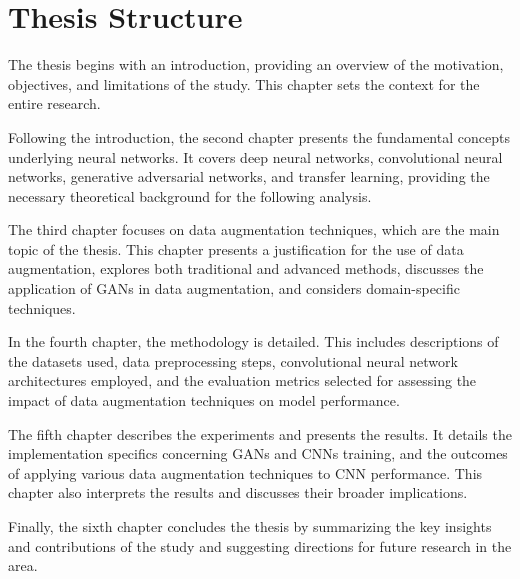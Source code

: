 \section{Thesis Structure}

The thesis begins with an introduction, providing an overview of the motivation, objectives, and limitations of the study. This chapter sets the context for the entire research.

Following the introduction, the second chapter presents the fundamental concepts underlying neural networks. It covers deep neural networks, convolutional neural networks, generative adversarial networks, and transfer learning, providing the necessary theoretical background for the following analysis.

The third chapter focuses on data augmentation techniques, which are the main topic of the thesis. This chapter presents a justification for the use of data augmentation, explores both traditional and advanced methods, discusses the application of GANs in data augmentation, and considers domain-specific techniques.

In the fourth chapter, the methodology is detailed. This includes descriptions of the datasets used, data preprocessing steps, convolutional neural network architectures employed, and the evaluation metrics selected for assessing the impact of data augmentation techniques on model performance.

The fifth chapter describes the experiments and presents the results. It details the implementation specifics concerning GANs and CNNs training, and the outcomes of applying various data augmentation techniques to CNN performance. This chapter also interprets the results and discusses their broader implications.

Finally, the sixth chapter concludes the thesis by summarizing the key insights and contributions of the study and suggesting directions for future research in the area.